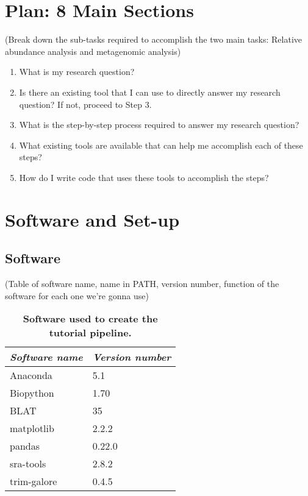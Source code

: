 
\chapter{Plan: 8 Main Sections}
(Break down the sub-tasks required to accomplish the two main tasks: Relative abundance analysis and metagenomic analysis)
%
\begin{enumerate}
    \item What is my research question?
    \item Is there an existing tool that I can use to directly answer my research question? If not, proceed to Step 3.
    \item What is the step-by-step process required to answer my research question?
    \item What existing tools are available that can help me accomplish each of these steps?
    \item How do I write code that uses these tools to accomplish the steps?
\end{enumerate}
%

\chapter{Software and Set-up}
\label{chap:software}
\section{Software}
(Table of software name, name in PATH, version number, function of the software for each one we're gonna use)
%
\begin{table}[htp]
    \begin{center}
    \begin{tabular}{ l | l }
        \textit{Software name} & \textit{Version number} \\ 
        \hline
        Anaconda & 5.1 \\  
        Biopython & 1.70 \\
        BLAT & 35 \\
        matplotlib & 2.2.2 \\
        pandas & 0.22.0 \\
        sra-tools & 2.8.2 \\
        trim-galore & 0.4.5 \\
    \end{tabular}
    \caption{\textbf{Software used to create the tutorial pipeline.}}
    \label{tab:software}
    \end{center}
    \label{software}
\end{table}
%
